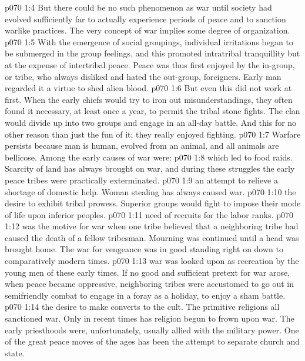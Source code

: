 \vs p070 1:4 But there could be no such phenomenon as war until society had evolved sufficiently far to actually experience periods of peace and to sanction warlike practices. The very concept of war implies some degree of organization.
\vs p070 1:5 With the emergence of social groupings, individual irritations began to be submerged in the group feelings, and this promoted intratribal tranquillity but at the expense of intertribal peace. Peace was thus first enjoyed by the in\hyp{}group, or tribe, who always disliked and hated the out\hyp{}group, foreigners. Early man regarded it a virtue to shed alien blood.
\vs p070 1:6 But even this did not work at first. When the early chiefs would try to iron out misunderstandings, they often found it necessary, at least once a year, to permit the tribal stone fights. The clan would divide up into two groups and engage in an all\hyp{}day battle. And this for no other reason than just the fun of it; they really enjoyed fighting.
\pc \vs p070 1:7 Warfare persists because man is human, evolved from an animal, and all animals are bellicose. Among the early causes of war were:
\pc \vs p070 1:8 \bibnobreakspace {} which led to food raids. Scarcity of land has always brought on war, and during these struggles the early peace tribes were practically exterminated.
\pc \vs p070 1:9 \bibnobreakspace {}an attempt to relieve a shortage of domestic help. Woman stealing has always caused war.
\pc \vs p070 1:10 \bibnobreakspace {}the desire to exhibit tribal prowess. Superior groups would fight to impose their mode of life upon inferior peoples.
\pc \vs p070 1:11 \bibnobreakspace {}need of recruits for the labor ranks.
\pc \vs p070 1:12 \bibnobreakspace {} was the motive for war when one tribe believed that a neighboring tribe had caused the death of a fellow tribesman. Mourning was continued until a head was brought home. The war for vengeance was in good standing right on down to comparatively modern times.
\pc \vs p070 1:13 \bibnobreakspace {}war was looked upon as recreation by the young men of these early times. If no good and sufficient pretext for war arose, when peace became oppressive, neighboring tribes were accustomed to go out in semifriendly combat to engage in a foray as a holiday, to enjoy a sham battle.
\pc \vs p070 1:14 \bibnobreakspace {}the desire to make converts to the cult. The primitive religions all sanctioned war. Only in recent times has religion begun to frown upon war. The early priesthoods were, unfortunately, usually allied with the military power. One of the great peace moves of the ages has been the attempt to separate church and state.
